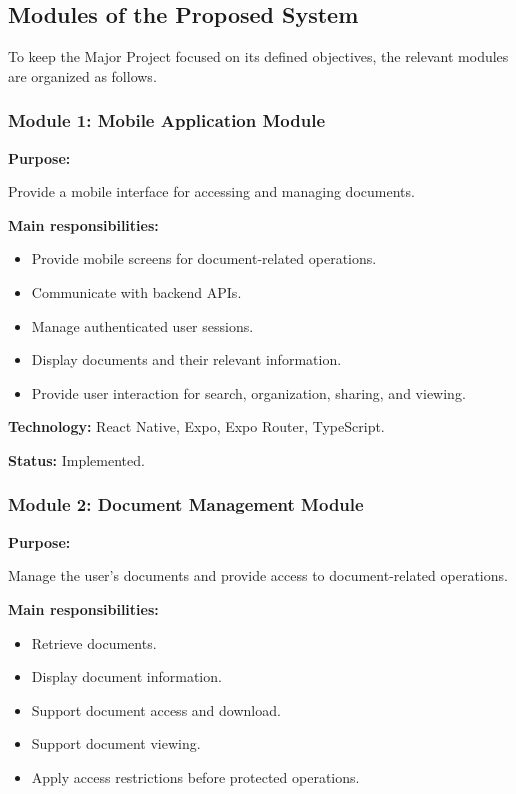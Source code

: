 \documentclass[12pt]{article}
\begin{document}
\subsection{Modules of the Proposed System}

To keep the Major Project focused on its defined objectives, the relevant modules are organized as follows.


\subsubsection{Module 1: Mobile Application Module}

\textbf{Purpose:}

Provide a mobile interface for accessing and managing documents.

\textbf{Main responsibilities:}

\begin{itemize}
    \item Provide mobile screens for document-related operations.
    \item Communicate with backend APIs.
    \item Manage authenticated user sessions.
    \item Display documents and their relevant information.
    \item Provide user interaction for search, organization, sharing, and viewing.
\end{itemize}

\textbf{Technology:} React Native, Expo, Expo Router, TypeScript.

\textbf{Status:} Implemented.


\subsubsection{Module 2: Document Management Module}

\textbf{Purpose:}

Manage the user's documents and provide access to document-related operations.

\textbf{Main responsibilities:}

\begin{itemize}
    \item Retrieve documents.
    \item Display document information.
    \item Support document access and download.
    \item Support document viewing.
    \item Apply access restrictions before protected operations.
\end{itemize}
\end{document}
